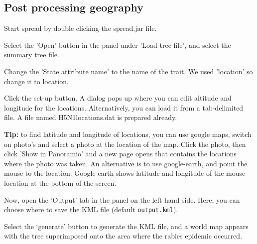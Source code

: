 \documentclass{article}
\begin{document}
\subsection*{Post processing geography}

Start spread by double clicking the spread.jar file.

Select the 'Open' button in the panel under 'Load tree file', and select the summary tree file.

Change the 'State attribute name' to the name of the trait. We used 'location' so change it to location.

Click the set-up button. A dialog pops up where you can edit altitude and longitude for the locations. 
Alternatively, you can load it from a tab-delimited file. A file named H5N1locations.dat is prepared already.

{\bf Tip:} to find latitude and longitude of locations, you can 
use google maps, switch on photo's and select a photo at the location 
of the map. Click the photo, then click 'Show in Panoramio' and a 
new page opens that contains the locations where the photo was taken.
An alternative is to use google-earth, and point the mouse to the 
location. Google earth shows latitude and longitude of the mouse 
location at the bottom of the screen.

Now, open the 'Output' tab in the panel on the left hand side. Here, you can choose where to save the KML file (default {\tt output.kml}).

Select the `generate' button to generate the KML file, and a world map appears with the tree superimposed onto the area where the rabies epidemic occurred.

\end{document}
